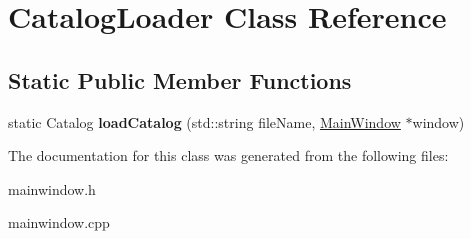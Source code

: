 \hypertarget{class_catalog_loader}{}\section{Catalog\+Loader Class Reference}
\label{class_catalog_loader}
\subsection*{Static Public Member Functions}
\begin{DoxyCompactItemize}
\item 
static Catalog {\bfseries load\+Catalog} (std\+::string file\+Name, \hyperlink{class_main_window}{Main\+Window} $\ast$window)\hypertarget{class_catalog_loader_a1dc00fc729be6d5955bca44ecb824dc5}{}\label{class_catalog_loader_a1dc00fc729be6d5955bca44ecb824dc5}

\end{DoxyCompactItemize}


The documentation for this class was generated from the following files\+:\begin{DoxyCompactItemize}
\item 
mainwindow.\+h\item 
mainwindow.\+cpp\end{DoxyCompactItemize}

